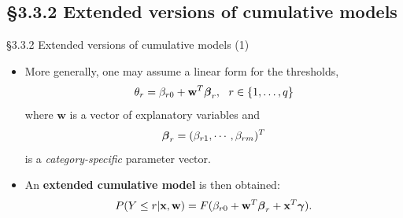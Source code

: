 \documentclass{beamer}
\newcommand{\currentsubsection}{}
\let\oldsubsection\subsection
\renewcommand{\subsection}[1]{\oldsubsection{#1}\renewcommand{\currentsubsection}{#1}}
\newenvironment{wideitemize}%
  {\begin{itemize}%
    \setlength{\parskip}{1em}}%
  {\end{itemize}}
\begin{document}
\subsection{\S3.3.2 Extended versions of cumulative models}\label{sec:3.3.2}
\begin{frame}{\S3.3.2 Extended versions of cumulative models (1)}

\begin{wideitemize}
\item
More generally, one may assume a linear form for the thresholds,
$$\theta_r=\beta_{r0}+\textbf{w}^T\mbox{\boldmath $\beta$}_r, \ \ r \in \{1,\dots, q\}$$
where $\textbf{w}$ is a vector of explanatory variables and 
\[
\mbox{\boldmath $\beta$}_r=(\beta_{r1},
\cdots,\beta_{rm})^T
\]
 is a \textit{category-specific} parameter vector.
\item 
An \textbf{extended cumulative model} is then obtained:
\begin{equation}
P(Y\leq r|\textbf{x}, \textbf{w})=F(\beta_{r0}+\textbf{w}^T\mbox{\boldmath $\beta$}_r+
\textbf{x}^T\mbox{\boldmath $\gamma$}). \label{eq-3.3.11} 
\end{equation}
\end{wideitemize}
\end{frame}
\end{document}
